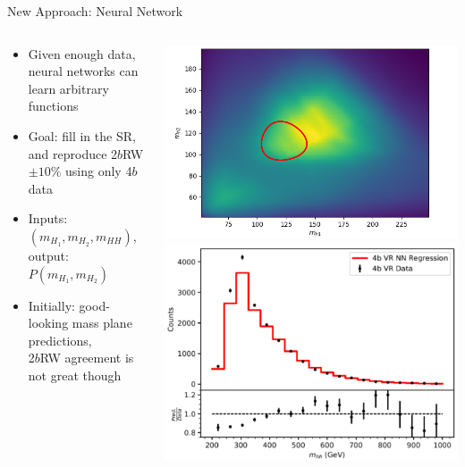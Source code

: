 \documentclass[10pt, aspectratio=169]{beamer}
\begin{document}
{
\begin{frame}{New Approach: Neural Network}
  \begin{columns}[onlytextwidth]
    \begin{column}{0.6\textwidth}
      \begin{itemize}
        \item Given enough data, neural networks can learn arbitrary functions
        \item Goal: fill in the SR, and reproduce 2$b$RW $\pm 10\%$ using only 4$b$ data
        \item Inputs: $(m_{H_1}, m_{H_2}, m_{HH})$, output: $P(m_{H_1}, m_{H_2})$
        \item Initially: good-looking mass plane predictions,\\
              2$b$RW agreement is not great though
      \end{itemize}
    \end{column}
    \begin{column}{0.4\textwidth}
      \includegraphics[width=\linewidth]{images/todd_nn_massplane.png}\\
      \hspace{0.3cm}\includegraphics[width=0.9\linewidth]{images/todd_nn_hist.png}\\

\end{column}
\end{columns}
\end{frame}}
\end{document}
